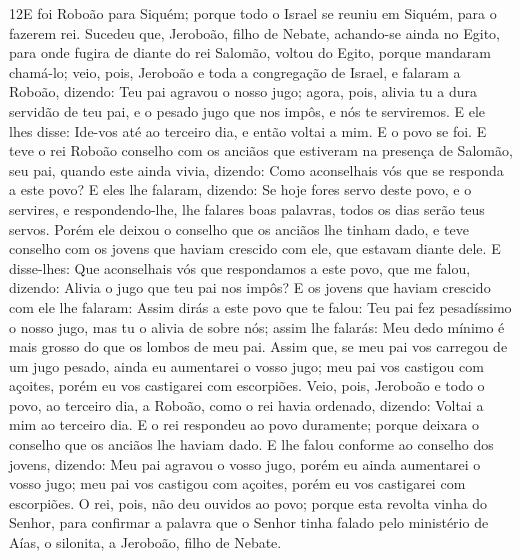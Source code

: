 \medskip

\lettrine{12} E foi Roboão para Siquém; porque todo o Israel
se reuniu em Siquém, para o fazerem rei. Sucedeu que, Jeroboão,
filho de Nebate, achando-se ainda no Egito, para onde fugira de
diante do rei Salomão, voltou do Egito, porque mandaram
chamá-lo; veio, pois, Jeroboão e toda a congregação de Israel, e
falaram a Roboão, dizendo: Teu pai agravou o nosso jugo; agora,
pois, alivia tu a dura servidão de teu pai, e o pesado jugo que nos
impôs, e nós te serviremos. E ele lhes disse: Ide-vos até ao
terceiro dia, e então voltai a mim. E o povo se foi. E teve o
rei Roboão conselho com os anciãos que estiveram na presença de
Salomão, seu pai, quando este ainda vivia, dizendo: Como aconselhais
vós que se responda a este povo? E eles lhe falaram, dizendo: Se
hoje fores servo deste povo, e o servires, e respondendo-lhe, lhe
falares boas palavras, todos os dias serão teus servos. Porém
ele deixou o conselho que os anciãos lhe tinham dado, e teve
conselho com os jovens que haviam crescido com ele, que estavam
diante dele. E disse-lhes: Que aconselhais vós que respondamos a
este povo, que me falou, dizendo: Alivia o jugo que teu pai nos
impôs? E os jovens que haviam crescido com ele lhe falaram:
Assim dirás a este povo que te falou: Teu pai fez pesadíssimo o
nosso jugo, mas tu o alivia de sobre nós; assim lhe falarás: Meu
dedo mínimo é mais grosso do que os lombos de meu pai. Assim
que, se meu pai vos carregou de um jugo pesado, ainda eu aumentarei
o vosso jugo; meu pai vos castigou com açoites, porém eu vos
castigarei com escorpiões. Veio, pois, Jeroboão e todo o
povo, ao terceiro dia, a Roboão, como o rei havia ordenado, dizendo:
Voltai a mim ao terceiro dia. E o rei respondeu ao povo
duramente; porque deixara o conselho que os anciãos lhe haviam dado.
E lhe falou conforme ao conselho dos jovens, dizendo: Meu pai
agravou o vosso jugo, porém eu ainda aumentarei o vosso jugo; meu
pai vos castigou com açoites, porém eu vos castigarei com
escorpiões. O rei, pois, não deu ouvidos ao povo; porque esta
revolta vinha do Senhor, para confirmar a palavra que o Senhor tinha
falado pelo ministério de Aías, o silonita, a Jeroboão, filho de
Nebate.

